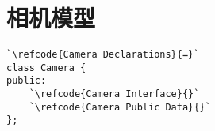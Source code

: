 \section{相机模型}\label{sec:相机模型}

\label{code:overview_Camera}
\begin{lstlisting}
`\refcode{Camera Declarations}{=}`
class Camera {
public:
    `\refcode{Camera Interface}{}`
    `\refcode{Camera Public Data}{}`
};
\end{lstlisting}